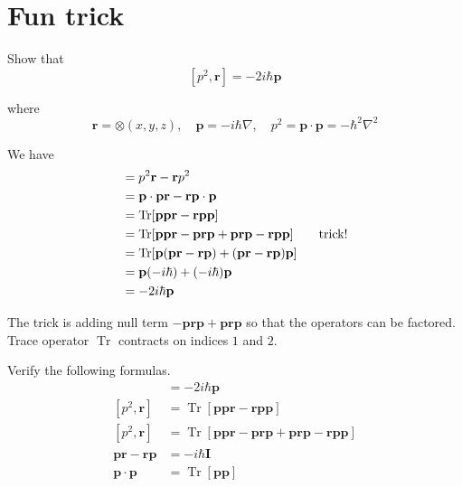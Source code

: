 

\section*{Fun trick}

Show that
\begin{equation*}
\left[p^2,\mathbf r\right]=-2i\hbar\mathbf p
\end{equation*}

where
\begin{equation*}
\mathbf r=\otimes(x,y,z),\quad
\mathbf p=-i\hbar\nabla,\quad
p^2=\mathbf p\cdot\mathbf p=-\hbar^2\nabla^2
\end{equation*}

We have
\begin{align*}
[p^2,\mathbf r]
&=p^2\mathbf r-\mathbf rp^2
\\
&=\mathbf p\cdot\mathbf p\mathbf r-\mathbf r \mathbf p\cdot\mathbf p
\\
&=\operatorname{Tr}[\mathbf{ppr}-\mathbf{rpp}]
\\
&=\operatorname{Tr}[\mathbf p\mathbf p\mathbf r-\mathbf p\mathbf r\mathbf p
+\mathbf p\mathbf r\mathbf p-\mathbf r\mathbf p\mathbf p]
\tag*{\text{trick!}}
\\
&=\operatorname{Tr}[\mathbf p(\mathbf{pr}-\mathbf{rp})
+(\mathbf{pr}-\mathbf{rp})\mathbf p]
\\
&=\mathbf p(-i\hbar)+(-i\hbar)\mathbf p
\\
&=-2i\hbar\mathbf p
\end{align*}

The trick is adding null term $-\mathbf{prp}+\mathbf{prp}$
so that the operators can be factored.
Trace operator $\operatorname{Tr}$ contracts on indices $1$ and $2$.

\bigskip
Verify the following formulas.
\begin{align*}
[p^2,\mathbf r]
&=-2i\hbar\mathbf p
\tag{1}
\\[1ex]
[p^2,\mathbf r]
&=\operatorname{Tr}[\mathbf{ppr}-\mathbf{rpp}]
\tag{2}
\\[1ex]
[p^2,\mathbf r]
&=\operatorname{Tr}[\mathbf p\mathbf p\mathbf r-\mathbf p\mathbf r\mathbf p
+\mathbf p\mathbf r\mathbf p-\mathbf r\mathbf p\mathbf p]
\tag{3}
\\[1ex]
\mathbf p\mathbf r-\mathbf r\mathbf p&=-i\hbar\mathbf I
\tag{4}
\\[1ex]
\mathbf p\cdot\mathbf p&=\operatorname{Tr}[\mathbf p\mathbf p]
\tag{5}
\end{align*}


